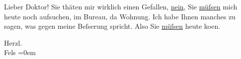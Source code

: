 \pstart
           Lieber Doktor! Sie thäten mir wirklich einen Gefallen, \uline{nein}, Sie \uline{müſsen} mich heute noch aufsuchen,
               im Bureau, da{\geminationn} Wohnung. Ich habe Ihnen manches zu sagen,
               was gegen meine Beſserung spricht. Also Sie \uline{müſsen}
               heute ko{\geminationm}en.\pend
           
\pstart
           Herzl.{\\[\baselineskip]}\spacefill\mbox{Fels}\pend
           \leftskip=0em{}\endnumbering{}  \newcommand{\dateiname}{L00153}\newcommand{\titel}{Friedrich M. Fels an Arthur Schnitzler, [1. 1. 1893?]}\newcommand{\editorInnen}{Martin Anton Müller und Gerd-Hermann Susen}
